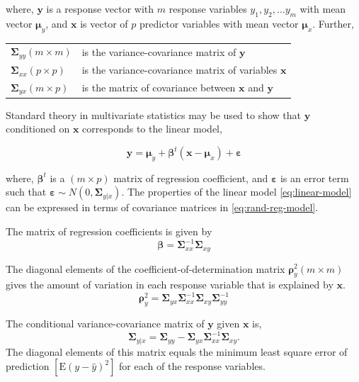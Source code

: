 \documentclass[review]{elsarticle}
\providecommand{\tightlist}{%
  \setlength{\itemsep}{0pt}\setlength{\parskip}{0pt}}
\theoremstyle{definition}
\theoremstyle{definition}
\theoremstyle{definition}
\theoremstyle{remark}
\begin{document}
where, \(\mathbf{y}\) is a response vector with \(m\) response variables
\(y_1, y_2, \ldots y_m\) with mean vector \(\boldsymbol{\mu}_y\), and
\(\mathbf{x}\) is vector of \(p\) predictor variables with mean vector
\(\boldsymbol{\mu}_x\). Further,

\begin{longtable}[]{@{}ll@{}}
\toprule
\(\boldsymbol{\Sigma}_{yy} (m \times m)\) & is the variance-covariance
matrix of \(\mathbf{y}\)\tabularnewline
\(\boldsymbol{\Sigma}_{xx} (p \times p)\) & is the variance-covariance
matrix of variables \(\mathbf{x}\)\tabularnewline
\(\boldsymbol{\Sigma}_{yx} (m \times p)\) & is the matrix of covariance
between \(\mathbf{x}\) and \(\mathbf{y}\)\tabularnewline
\bottomrule
\end{longtable}

\addtocounter{table}{-1}

Standard theory in multivariate statistics may be used to show that
\(\mathbf{y}\) conditioned on \(\mathbf{x}\) corresponds to the linear
model,

\begin{equation}
\mathbf{y} = \boldsymbol{\mu}_y + \boldsymbol{\beta}^t (\mathbf{x} - \boldsymbol{\mu}_x) + \boldsymbol{\varepsilon}
  \label{eq:linear-model}
\end{equation}

where, \(\boldsymbol{\beta}^t\) is a \((m \times p)\) matrix of
regression coefficient, and \(\boldsymbol{\varepsilon}\) is an error
term such that
\(\boldsymbol{\varepsilon} \sim N\left(0, \boldsymbol{\Sigma}_{y|x}\right)\).
The properties of the linear model \eqref{eq:linear-model} can be
expressed in terms of covariance matrices in \eqref{eq:rand-reg-model}.

\begin{description}
\tightlist
\item[Regression Coefficients]
The matrix of regression coefficients is given by
\[ \boldsymbol{\beta} = \boldsymbol{\Sigma}_{xx}^{-1}\boldsymbol{\Sigma}_{xy}\]
\item[Coefficient of Determination]
The diagonal elements of the coefficient-of-determination matrix
\(\boldsymbol{\rho}_y^2 (m \times m)\) gives the amount of variation in
each response variable that is explained by \(\mathbf{x}\).
\[\boldsymbol{\rho}_y^2 = \boldsymbol{\Sigma}_{yx}\boldsymbol{\Sigma}_{xx}^{-1}\boldsymbol{\Sigma}_{xy}\boldsymbol{\Sigma}_{yy}^{-1}\]
\item[Conditional variance]
The conditional variance-covariance matrix of \(\mathbf{y}\) given
\(\mathbf{x}\) is,
\[\boldsymbol{\Sigma}_{y|x} = \boldsymbol{\Sigma}_{yy} - \boldsymbol{\Sigma}_{yx}\boldsymbol{\Sigma}_{xx}^{-1}\boldsymbol{\Sigma}_{xy}.\]
The diagonal elements of this matrix equals the minimum least square
error of prediction \(\left[\mathrm{E}(y - \hat{y})^2\right]\) for each
of the response variables.
\end{description}
\end{document}
